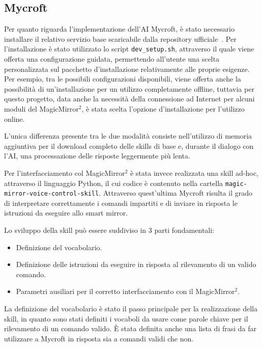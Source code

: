 \documentclass[12pt,a4paper]{article}
\begin{document}
\subsection{Mycroft}\label{mycroft}

Per quanto riguarda l'implementazione dell'AI Mycroft, \`e stato necessario installare il relativo
servizio base scaricabile dalla repository ufficiale~\cite{MycroftRepo}. Per l'installazione \`e stato
utilizzato lo script \verb|dev_setup.sh|, attraverso il quale viene offerta una configurazione guidata,
permettendo all'utente una scelta personalizzata sul pacchetto d'installazione relativamente alle proprie
esigenze. Per esempio, tra le possibili configurazioni disponibili, viene offerta anche la possibilit\`a di 
un'installazione per un utilizzo completamente offline, tuttavia per questo progetto, data anche la
necessit\`a della connessione ad Internet per alcuni moduli del MagicMirror$^2$, \`e stata scelta
l'opzione d'installazione per l'utilizzo online.

L'unica differenza presente tra le due modalit\`a consiste nell'utilizzo di memoria aggiuntiva per il download
completo delle skills di base e, durante il dialogo con l'AI, una processazione delle risposte leggermente
pi\`u lenta.

Per l'interfacciamento col MagicMirror$^2$ \`e stata invece realizzata una skill ad-hoc, attraverso il linguaggio
Python, il cui codice \`e contenuto nella cartella \verb|magic-mirror-voice-control-skill|. Attraverso quest'ultima
Mycroft risulta il grado di interpretare correttamente i comandi impartiti e di inviare in risposta le istruzioni
da eseguire allo smart mirror.

Lo sviluppo della skill pu\`o essere suddiviso in 3 parti fondamentali:
\begin{itemize}
  \item Definizione del vocabolario.
  \item Definizione delle istruzioni da eseguire in risposta al rilevamento di un valido comando.
  \item Parametri ausiliari per il corretto interfacciamento con il MagicMirror$^2$.
\end{itemize}

La definizione del vocabolario \`e stato il passo principale per la realizzazione della skill, in quanto sono
stati definiti i vocaboli da usare come parole chiave per il rilevamento di un comando valido. \`E stata
definita anche una lista di frasi da far utilizzare a Mycroft in risposta sia a comandi validi che non.
\end{document}
